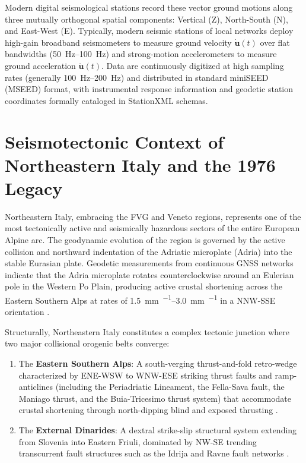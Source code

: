 Modern digital seismological stations record these vector ground motions along
three mutually orthogonal spatial components: Vertical (Z), North-South (N),
and East-West (E). Typically, modern seismic stations of local networks deploy
high-gain broadband seismometers to measure ground velocity
$\dot{\mathbf{u}}(t)$ over flat bandwidths (\qtyrange{50}{100}{\hertz})
and strong-motion accelerometers to measure ground acceleration
$\ddot{\mathbf{u}}(t)$. Data are continuously digitized at high sampling rates
(generally \qtyrange{100}{200}{\hertz}) and distributed in standard miniSEED
(MSEED) format, with instrumental response information and geodetic station
coordinates formally cataloged in StationXML schemas.

\section{Seismotectonic Context of Northeastern Italy and the 1976 Legacy}
\label{sec:tectonics}

Northeastern Italy, embracing the \acf{FVG} and Veneto regions, represents one
of the most tectonically active and seismically hazardous sectors of the entire
European Alpine arc. The geodynamic evolution of the region is governed by the
active collision and northward indentation of the Adriatic microplate (Adria)
into the stable Eurasian plate. Geodetic measurements from continuous GNSS
networks indicate that the Adria microplate rotates counterclockwise around an
Eulerian pole in the Western Po Plain, producing active crustal shortening
across the Eastern Southern Alps at rates of
\qtyrange{1.5}{3.0}{\milli\meter\per\year} in a NNW-SSE orientation
\parencite{AndersonJackson1987,Handy2014,Tunini2024}.

Structurally, Northeastern Italy constitutes a complex tectonic junction where
two major collisional orogenic belts converge:
\begin{enumerate}
  \item The \textbf{Eastern Southern Alps}: A south-verging thrust-and-fold
    retro-wedge characterized by ENE-WSW to WNW-ESE striking thrust faults and
    ramp-anticlines (including the Periadriatic Lineament, the Fella-Sava
    fault, the Maniago thrust, and the Buia-Tricesimo thrust system) that
    accommodate crustal shortening through north-dipping blind and exposed
    thrusting \parencite{Bressan2018}.
  \item The \textbf{External Dinarides}: A dextral strike-slip structural
    system extending from Slovenia into Eastern Friuli, dominated by NW-SE
    trending transcurrent fault structures such as the Idrija and Ravne fault
    networks \parencite{Bressan1998}.
\end{enumerate}

